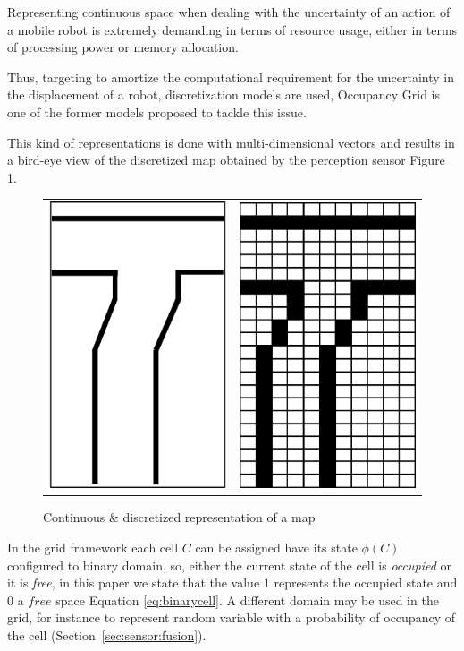Representing continuous space when dealing with the uncertainty of an action of a mobile robot is extremely demanding in terms of resource usage, either in terms of processing power or memory allocation.

Thus, targeting to amortize the computational requirement for the uncertainty in the displacement of a robot, discretization models are used, Occupancy Grid\cite{Elfes:1989:UOG:68491.68495} is one of the former models proposed to tackle this issue.

This kind of representations is done with multi-dimensional vectors and results in a bird-eye view of the discretized map obtained by the perception sensor Figure \ref{fig:grid:continuous:discretized}.

\begin{figure}[h]
\centering
	\begin{tabular}{lr}\\
		\includegraphics[width=0.25\columnwidth]{img/fig:grid:continuous} &
		\includegraphics[width=0.25\columnwidth]{img/fig:grid:discretized}
	\end{tabular}
	\caption{Continuous \& discretized representation of a map}
	\label{fig:grid:continuous:discretized}
\end{figure}

In the grid framework each cell $C$ can be assigned have its state $\phi(C)$ configured to binary domain, so, either the current state of the cell is \textit{occupied} or it is \textit{free}, in this paper we state that the value $1$ represents the occupied state and $0$ a $free$ space Equation \ref{eq:binarycell}. A different domain may be used in the grid, for instance to represent random variable with a probability of occupancy of the cell (Section~\ref{sec:sensor:fusion}).


